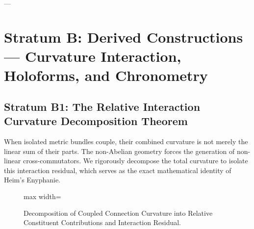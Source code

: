 \documentclass[
    12pt,
    a4paper,
    headings=normal,
    twoside=true,
    BCOR=8mm,
]{scrbook}
\makeatletter
\let\text\@firstofone
\let\mathbf\@firstofone
\let\mathcal\@firstofone
\let\operatorname\@firstofone
\def\Omega{Omega}%
\makeatother
\begin{document}
---

\section{Stratum B: Derived Constructions — Curvature Interaction, Holoforms, and Chronometry}

\subsection{Stratum B1: The Relative Interaction Curvature Decomposition Theorem}
\label{sec:ch4_curvature_decomposition}

When isolated metric bundles couple, their combined curvature is not merely the linear sum of their parts. The non-Abelian geometry forces the generation of non-linear cross-commutators. We rigorously decompose the total curvature to isolate this interaction residual, which serves as the exact mathematical identity of Heim's Enyphanie.

\begin{figure}[htbp]
\centering
\begin{adjustbox}{max width=\textwidth}\end{adjustbox}
\caption{Decomposition of Coupled Connection Curvature into Relative Constituent Contributions and Interaction Residual.}
\label{fig:interaction_curvature_decomp}
\end{figure}
\end{document}
